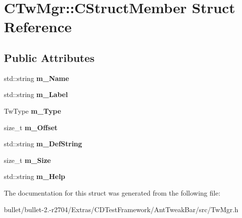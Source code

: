 \hypertarget{struct_c_tw_mgr_1_1_c_struct_member}{\section{C\+Tw\+Mgr\+:\+:C\+Struct\+Member Struct Reference}
\label{struct_c_tw_mgr_1_1_c_struct_member}
}
\subsection*{Public Attributes}
\begin{DoxyCompactItemize}
\item 
\hypertarget{struct_c_tw_mgr_1_1_c_struct_member_a24c33647ebbc9e817846c2b70e182ff4}{std\+::string {\bfseries m\+\_\+\+Name}}\label{struct_c_tw_mgr_1_1_c_struct_member_a24c33647ebbc9e817846c2b70e182ff4}

\item 
\hypertarget{struct_c_tw_mgr_1_1_c_struct_member_a293a1ad9cc17029486d08aa8327e5f23}{std\+::string {\bfseries m\+\_\+\+Label}}\label{struct_c_tw_mgr_1_1_c_struct_member_a293a1ad9cc17029486d08aa8327e5f23}

\item 
\hypertarget{struct_c_tw_mgr_1_1_c_struct_member_ad6ab43d44a8c0a28cb6418e589fda4b8}{Tw\+Type {\bfseries m\+\_\+\+Type}}\label{struct_c_tw_mgr_1_1_c_struct_member_ad6ab43d44a8c0a28cb6418e589fda4b8}

\item 
\hypertarget{struct_c_tw_mgr_1_1_c_struct_member_a6942cabd8d269ab75fb16b212654a722}{size\+\_\+t {\bfseries m\+\_\+\+Offset}}\label{struct_c_tw_mgr_1_1_c_struct_member_a6942cabd8d269ab75fb16b212654a722}

\item 
\hypertarget{struct_c_tw_mgr_1_1_c_struct_member_aacb8153d933976d5868ed5d7630b076f}{std\+::string {\bfseries m\+\_\+\+Def\+String}}\label{struct_c_tw_mgr_1_1_c_struct_member_aacb8153d933976d5868ed5d7630b076f}

\item 
\hypertarget{struct_c_tw_mgr_1_1_c_struct_member_a5f7a9aafa297ed2c30812e91973ac5d8}{size\+\_\+t {\bfseries m\+\_\+\+Size}}\label{struct_c_tw_mgr_1_1_c_struct_member_a5f7a9aafa297ed2c30812e91973ac5d8}

\item 
\hypertarget{struct_c_tw_mgr_1_1_c_struct_member_a29d107d00cd5e55038a8cd926c4a2784}{std\+::string {\bfseries m\+\_\+\+Help}}\label{struct_c_tw_mgr_1_1_c_struct_member_a29d107d00cd5e55038a8cd926c4a2784}

\end{DoxyCompactItemize}


The documentation for this struct was generated from the following file\+:\begin{DoxyCompactItemize}
\item 
bullet/bullet-\/2.-\/r2704/\+Extras/\+C\+D\+Test\+Framework/\+Ant\+Tweak\+Bar/src/Tw\+Mgr.\+h\end{DoxyCompactItemize}
